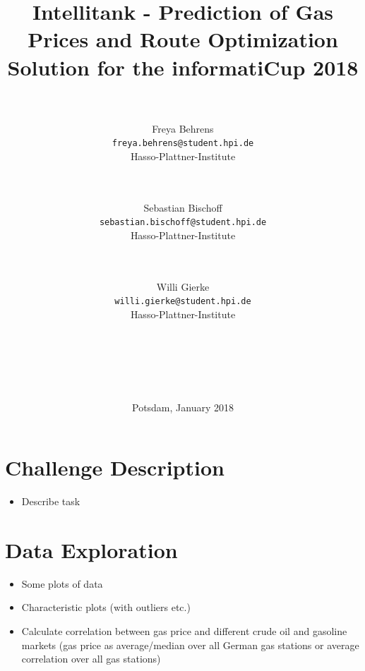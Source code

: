\documentclass[%
a4paper,
DIV12,
2.5headlines,
bigheadings,
titlepage,
openbib,
]{scrartcl}
\begin{document}
\providecommand{\tightlist}{%
  \setlength{\itemsep}{0pt}\setlength{\parskip}{0pt}}

\DeclareRobustCommand{\desiredTitle}{
  Intellitank - Prediction of Gas Prices and Route Optimization \\\normalsize{Solution for the informatiCup 2018}
}

\DeclareRobustCommand{\desiredAuthor}{
  \\\\Freya Behrens\\\texttt{freya.behrens@student.hpi.de}\\Hasso-Plattner-Institute \and \\\\Sebastian Bischoff\\\texttt{sebastian.bischoff@student.hpi.de}\\Hasso-Plattner-Institute \and \\\\Willi Gierke\\\texttt{willi.gierke@student.hpi.de}\\Hasso-Plattner-Institute\\\\\\\\\\\\
}

\begin{titlepage}
\begin{center}
   \title{\desiredTitle}
   \author{\desiredAuthor}
   \date{Potsdam, January 2018}
   \maketitle
\end{center}
\end{titlepage}

\pagebreak

\tableofcontents
\pagebreak

\section{Challenge Description}\label{challenge-description}
\begin{itemize}
\item Describe task
\end{itemize}

\section{Data Exploration}\label{data-exploration}
\begin{itemize}
\item Some plots of data\\
\item Characteristic plots (with outliers etc.)
\item Calculate correlation between gas price and different crude oil and gasoline markets (gas price as average/median over all German gas stations or average correlation over all gas stations)
\end{itemize}
\end{document}

